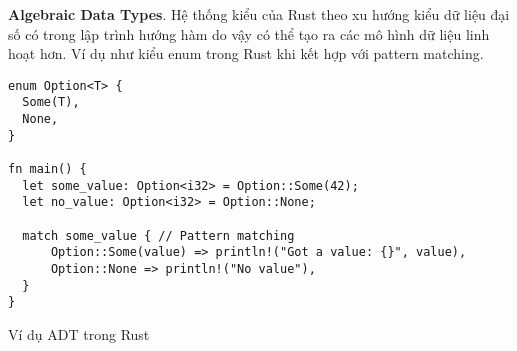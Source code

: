 
\textbf{Algebraic Data Types}. Hệ thống kiểu của Rust theo xu hướng kiểu dữ liệu đại số có trong lập trình hướng hàm do vậy có thể tạo ra các mô hình dữ liệu linh hoạt hơn.
Ví dụ như kiểu enum trong Rust khi kết hợp với pattern matching.

\begin{listing}[H]
\begin{verbatim}
enum Option<T> {
  Some(T),
  None,
}

fn main() {
  let some_value: Option<i32> = Option::Some(42);
  let no_value: Option<i32> = Option::None;

  match some_value { // Pattern matching
      Option::Some(value) => println!("Got a value: {}", value),
      Option::None => println!("No value"),
  }
}
\end{verbatim}
\caption{Ví dụ ADT trong Rust}
\label{code:fp_adt}
\end{listing}
